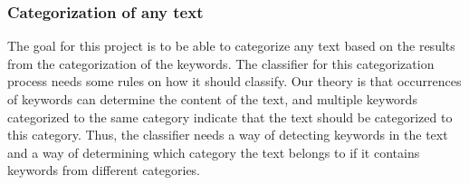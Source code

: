 
\subsubsection{Categorization of any text}
The goal for this project is to be able to categorize any text based on the results from the categorization of the keywords. The classifier for this categorization process needs some rules on how it should classify. Our theory is that occurrences of keywords can determine the content of the text, and multiple keywords categorized to the same category indicate that the text should be categorized to this category. Thus, the classifier needs a way of detecting keywords in the text and a way of determining which category the text belongs to if it contains keywords from different categories. 





